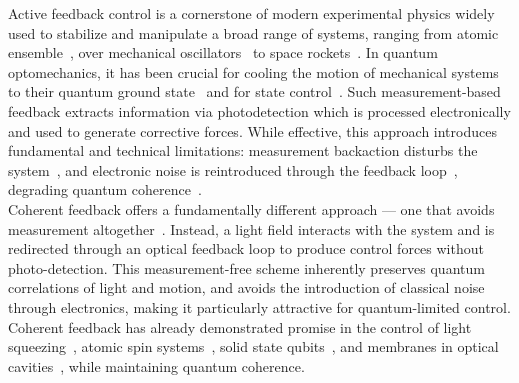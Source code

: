 \documentclass[reprint,aps,prl,superscriptaddress]{revtex4-2}
\begin{document}
Active feedback control is a cornerstone of modern experimental physics widely used to stabilize and manipulate a broad range of systems, ranging from atomic ensemble~\cite{fischer2002feedback,steck2004quantum}, over mechanical oscillators~\cite{Wang2023-fast-feedback-mechanical,  Wilson2015-measurement-control-mechanical,Poggio2007-feedack-cantilever-5mK} to space rockets~\cite{Tewari2011-Control-aircraft-rockets}. In quantum optomechanics, it has been crucial for cooling the motion of mechanical systems to their quantum ground state~\cite{Guo2023-Active-feedback-resonator, Rossi2018-Measurement-based-ground-state} and for state control~\cite{wang2023fast}. %
Such measurement-based feedback extracts information via photodetection which is processed electronically and used to generate corrective forces. While effective, this approach introduces fundamental and technical limitations: measurement backaction disturbs the system~\cite{Purdy2013-pressure-shot-noise-object, Teufel2016-overwhelming-shot-noise}, and electronic noise is reintroduced through the feedback loop~\cite{Poggio2007-feedack-cantilever-5mK}, degrading quantum coherence~\cite{Genes2008-comparing-cold-damping-cavity-assisted}.\\
Coherent feedback offers a fundamentally different approach — one that avoids measurement altogether~\cite{Lloyd2000-coherent-quantum-feedback}. Instead, a light field interacts with the system and is redirected through an optical feedback loop to produce control forces without photo-detection. This measurement-free scheme inherently preserves quantum correlations of light and motion, and avoids the introduction of classical noise through electronics, making it particularly attractive for quantum-limited control. Coherent feedback has already demonstrated promise in the control of light squeezing~\cite{iida2012experimental}, atomic spin systems~\cite{nelson2000experimental, Karg2020-Stron-coupling-membrane-atomic-spin, Schmid2022-coherent-cooling-membrane-atomic-spin}, solid state qubits~\cite{Hirose2016-coherent-feedback-qubit-diamond}, and membranes in optical cavities~\cite{Ernzer2023-coherent-cooling-membrane}, while maintaining quantum coherence.
\end{document}
